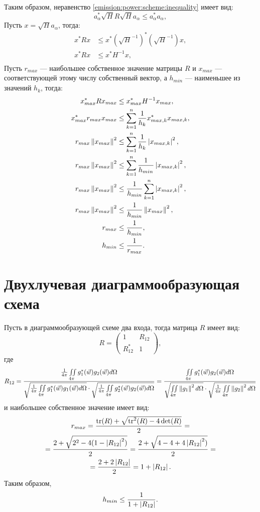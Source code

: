 Таким образом, неравенство \eqref{emission:power:scheme:inequality} имеет вид:
\[
    a_\alpha^* \sqrt{H} R \sqrt{H} a_\alpha \le a_\alpha^* a_\alpha ,
\]
Пусть $x = \sqrt{H} a_\alpha$, тогда:
\begin{align*}
    x^* R x & \le x^* (\sqrt{H}^{-1})^* (\sqrt{H}^{-1}) x , \\
    x^* R x & \le x^* H^{-1} x , \\
\end{align*}
Пусть $r_{max}$ --- наибольшее собственное значение матрицы $R$ и $x_{max}$ --- соответствующей этому числу собственный вектор, а $h_{min}$ --- наименьшее из
значений $h_k$, тогда:
\begin{align*}
    x_{max}^* R x_{max} & \le x_{max}^* H^{-1} x_{max} , \\
    x_{max}^* r_{max} x_{max} & \le \sum_{k=1}^n \frac{1}{h_k} x_{max,k}^* x_{max,k} , \\
    r_{max} \left \| x_{max} \right \|^2 & \le \sum_{k=1}^n \frac{1}{h_k} \left | x_{max,k} \right |^2 , \\
    r_{max} \left \| x_{max} \right \|^2 & \le \sum_{k=1}^n \frac{1}{h_{min}} \left | x_{max,k} \right |^2 , \\
    r_{max} \left \| x_{max} \right \|^2 & \le \frac{1}{h_{min}} \sum_{k=1}^n \left | x_{max,k} \right |^2 , \\
    r_{max} \left \| x_{max} \right \|^2 & \le \frac{1}{h_{min}} \left \| x_{max} \right \|^2 , \\
    r_{max} & \le \frac{1}{h_{min}} , \\
    h_{min} & \le \frac{1}{r_{max}} .
\end{align*}


\section{Двухлучевая диаграммообразующая схема}

Пусть в диаграммообразующей схеме два входа, тогда матрица $R$ имеет вид:
\[
    R
    = \begin{pmatrix}
          1        & R_{12} \\
          R_{12}^* & 1
    \end{pmatrix} ,
\]
где
\[
    R_{12}
    =
    \frac
    {\frac{1}{4 \pi} \iint \limits_{4 \pi} g_1^*(\vec{w}) g_2(\vec{w}) d \Omega}
    {\sqrt{\frac{1}{4 \pi} \iint \limits_{4 \pi} g_1^*(\vec{w}) g_1(\vec{w}) d \Omega} \cdot \sqrt{\frac{1}{4 \pi} \iint \limits_{4 \pi} g_2^*(\vec{w}) g_2(\vec{w}) d \Omega}}
    = \frac
    {\iint \limits_{4 \pi} g_1^*(\vec{w}) g_2(\vec{w}) d \Omega}
    {\sqrt{\iint \limits_{4 \pi} \left \| g_1 \right \|^2 d \Omega} \cdot \sqrt{\frac{1}{4 \pi} \iint \limits_{4 \pi} \left \| g_2 \right \|^2 d \Omega}}
\]
и наибольшее собственное значение имеет вид:
\begin{multline*}
    r_{max}
    = \frac{\operatorname{tr}(R) + \sqrt{\operatorname{tr}^2(R) - 4 \det(R)}}{2} = \\
    = \frac{2 + \sqrt{2^2 - 4 (1 - \left | R_{12} \right |^2)}}{2}
    = \frac{2 + \sqrt{4 - 4 + 4 \left | R_{12} \right |^2)}}{2} = \\
    = \frac{2 + 2 \left | R_{12} \right |}{2}
    = 1 + \left | R_{12} \right | .
\end{multline*}
Таким образом,
\[
    h_{min} \le \frac{1}{1 + \left | R_{12} \right |} .
\]
